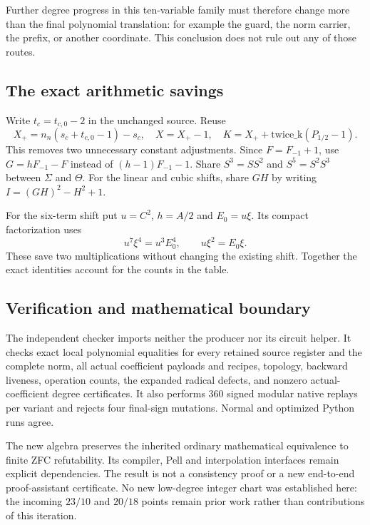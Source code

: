 \documentclass[11pt]{article}
\begin{document}
Further degree progress in this ten-variable family must therefore change
more than the final polynomial translation: for example the guard, the norm
carrier, the prefix, or another coordinate. This conclusion does not rule
out any of those routes.

\subsection{The exact arithmetic savings}
Write $t_c=t_{c,0}-2$ in the unchanged source. Reuse
\[
 X_+=n_n(s_c+t_{c,0}-1)-s_c,
 \quad X=X_+-1,
 \quad K=X_++\mathrm{twice\_k}(P_{1/2}-1).
\]
This removes two unnecessary constant adjustments. Since $F=F_{-1}+1$,
use $G=hF_{-1}-F$ instead of $(h-1)F_{-1}-1$. Share
$S^3=SS^2$ and $S^5=S^2S^3$ between $\Sigma$ and $\Theta$.
For the linear and cubic shifts, share $GH$ by writing
$I=(GH)^2-H^2+1$.

For the six-term shift put $u=C^2$, $h=A/2$ and $E_0=u\xi$. Its compact
factorization uses
\[
 u^7\xi^4=u^3E_0^4,\qquad u\xi^2=E_0\xi.
\]
These save two multiplications without changing the existing shift.
Together the exact identities account for the counts in the table.

\subsection{Verification and mathematical boundary}
The independent checker imports neither the producer nor its circuit
helper. It checks exact local polynomial equalities for every retained
source register and the complete norm, all actual coefficient payloads and
recipes, topology, backward liveness, operation counts, the expanded radical
defects, and nonzero actual-coefficient degree certificates. It also performs
$360$ signed modular native replays per variant and rejects four final-sign
mutations. Normal and optimized Python runs agree.

The new algebra preserves the inherited ordinary mathematical equivalence
to finite ZFC refutability. Its compiler, Pell and interpolation interfaces
remain explicit dependencies. The result is not a consistency proof or a
new end-to-end proof-assistant certificate. No new low-degree integer chart
was established here: the incoming $23/10$ and $20/18$ points remain prior
work rather than contributions of this iteration.
\end{document}

